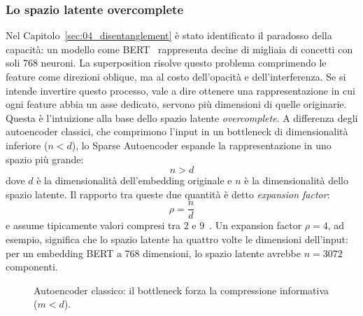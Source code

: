 \subsubsection{Lo spazio latente overcomplete}
\label{subsubsec:sae_overcomplete}
Nel Capitolo~\ref{sec:04_disentanglement} è stato identificato il paradosso della capacità: un modello come BERT~\parencite{devlin2018bert} rappresenta decine di migliaia di concetti con soli 768 neuroni. La superposition risolve questo problema comprimendo le feature come direzioni oblique, ma al costo dell'opacità e dell'interferenza. Se si intende invertire questo processo, vale a dire ottenere una rappresentazione in cui ogni feature abbia un asse dedicato, servono più dimensioni di quelle originarie.
Questa è l'intuizione alla base dello spazio latente \textit{overcomplete}. A differenza degli autoencoder classici, che comprimono l'input in un bottleneck di dimensionalità inferiore ($n < d$), lo Sparse Autoencoder espande la rappresentazione in uno spazio più grande:
\begin{equation}
    n > d
\end{equation}
dove $d$ è la dimensionalità dell'embedding originale e $n$ è la dimensionalità dello spazio latente.
Il rapporto tra queste due quantità è detto \textit{expansion factor}:
\begin{equation}
    \rho = \frac{n}{d}
\end{equation}
e assume tipicamente valori compresi tra 2 e 9~\parencite{oneill2024disentangling}. Un expansion factor $\rho = 4$, ad esempio, significa che lo spazio latente ha quattro volte le dimensioni dell'input: per un embedding BERT a 768 dimensioni, lo spazio latente avrebbe $n = 3072$ componenti.
\begin{figure}[htbp]
    \centering
    \caption{Autoencoder classico: il bottleneck forza la compressione informativa ($m < d$).}
    \label{fig:ae_classico}
\end{figure}


